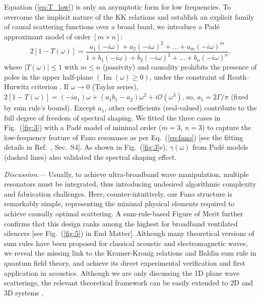 \documentclass[final,5p,times,twocolumn]{elsarticle}
\begin{document}
Equation (\ref{eq:T_low}) is only an asymptotic form for low frequencies. {\color{black}To overcome the implicit nature of the KK relations and establish an explicit family of causal scattering functions over a broad band, we introduce a Padé approximant model \cite{friedland2012control} of order \([m \times n]\):}
\begin{equation}
	2\left[1-T(\omega) \right]  = \frac{a_1(-i\omega)+a_2(-i\omega)^2+...+a_m(-i\omega)^m}{1+b_1(-i\omega)+b_2(-i\omega)^2+...+b_n(-i\omega)^n}, \label{eq:Pade}
\end{equation}
where $|T(\omega)|\leq1$ with $m\leq n$ (passivity) and causality prohibits the presence of poles in the upper half-plane $(\operatorname{Im}(\omega)\geq0)$, under the constraint of Routh–Hurwitz criterion \cite{friedland2012control}. If $\omega\to0$ (Taylor series), $2[1-T(\omega)]=\left(-i a_1\right) \omega+\left(a_1 b_1-a_2\right) \omega^2+i\mathcal{O}(\omega^3)$, so, $ a_1 = 2\Gamma/\pi$ (fixed by sum rule's bound). Except $a_1$, other coefficients (real-valued) contribute to the full degree of freedom of spectral shaping. We fitted the three cases in Fig.~(\ref{fig:3}) with a Padé model of minimal order ($m=3$, $n=3$) to capture the low-frequency feature of Fano resonance as per Eq.~(\ref{eq:fano}) [see the fitting details in Ref.~\cite{labelSM}, Sec.~S4]. As shown in Fig.~(\ref{fig:3}e),  $\gamma(\omega)$ from Padé models (dashed lines) also {\color{black}validated the spectral shaping effect}.

\textit{Discussion.}— Usually, to achieve ultra-broadband wave manipulation, multiple resonators must be integrated, thus introducing undesired algorithmic complexity and fabrication challenges. Here, counter-intuitively, our Fano structure is remarkably simple, representing the minimal physical elements required to achieve causally optimal scattering. A sum-rule-based Figure of Merit further confirms that this design ranks among the highest for broadband ventilated silencers \cite{wang2023meta,nguyen2020broadband,jia2025acoustic,lu2025ultra,mei2025reconfigurable,dong2021ultrabroadband,xu2024broadband,fu2025ultrabroadband,jimenez2017rainbow} [see Fig.~(\ref{fig:5}) in End Matter]. {\color{black}Although many theoretical versions of sum rules have been proposed for classical acoustic \cite{meng2022fundamental,norris2018integral} and electromagnetic \cite{padilla2024fundamental,gustafsson2010sum} waves, we reveal the missing link to the Kramer-Kronig relations and Baldin sum rule in quantum field theory, and achieve its direct experimental verification and first application in acoustics.} Although we are only discussing the 1D plane wave scatterings, the relevant theoretical framework can be easily extended to 2D and 3D systems \cite{ramachandran2023bandwidth,martin2024acoustic}.
\end{document}
